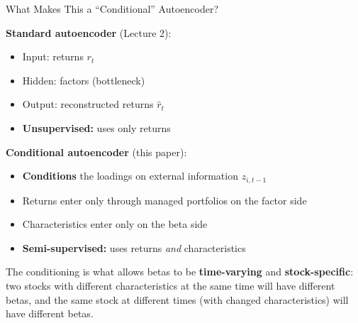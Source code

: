 \documentclass[aspectratio=169]{beamer}
\begin{document}
\begin{frame}{What Makes This a ``Conditional'' Autoencoder?}

\textbf{Standard autoencoder} (Lecture 2):
\begin{itemize}
    \item Input: returns $r_t$
    \item Hidden: factors (bottleneck)
    \item Output: reconstructed returns $\hat{r}_t$
    \item \textbf{Unsupervised:} uses only returns
\end{itemize}

\vspace{0.5em}
\textbf{Conditional autoencoder} (this paper):
\begin{itemize}
    \item \textbf{Conditions} the loadings on external information $z_{i,t-1}$
    \item Returns enter only through managed portfolios on the factor side
    \item Characteristics enter only on the beta side
    \item \textbf{Semi-supervised:} uses returns \emph{and} characteristics
\end{itemize}

\vspace{0.5em}
The conditioning is what allows betas to be \textbf{time-varying} and \textbf{stock-specific}: two stocks with different characteristics at the same time will have different betas, and the same stock at different times (with changed characteristics) will have different betas.
\end{frame}
%
\end{document}
